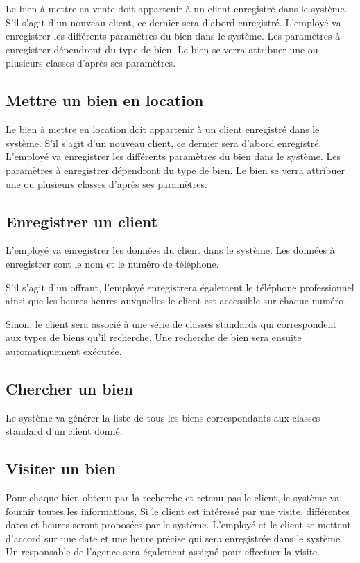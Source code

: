 Le bien à mettre en vente doit appartenir à un client enregistré dans le système. S'il s'agit d'un nouveau client, ce dernier sera d'abord enregistré. L'employé va enregistrer les différents paramètres du bien dans le système. Les paramètres à enregistrer dépendront du type de bien. Le bien se verra attribuer une ou plusieurs classes d'après ses paramètres.

\subsection{Mettre un bien en location}

Le bien à mettre en location doit appartenir à un client enregistré dans le système. S'il s'agit d'un nouveau client, ce dernier sera d'abord enregistré. L'employé va enregistrer les différents paramètres du bien dans le système. Les paramètres à enregistrer dépendront du type de bien. Le bien se verra attribuer une ou plusieurs classes d'après ses paramètres.

\subsection{Enregistrer un client}

L'employé va enregistrer les données du client dans le système. Les données à enregistrer sont le nom et le numéro de téléphone.

S'il s'agit d'un offrant, l'employé enregistrera également le téléphone professionnel ainsi que les heures heures auxquelles le client est accessible sur chaque numéro.

Sinon, le client sera associé à une série de classes standards qui correspondent aux types de biens qu'il recherche. Une recherche de bien sera ensuite automatiquement exécutée.

\subsection{Chercher un bien}

Le système va générer la liste de tous les biens correspondants aux classes standard d'un client donné.

\subsection{Visiter un bien}

Pour chaque bien obtenu par la recherche et retenu pas le client, le système va fournir toutes les informations. Si le client est intéressé par une visite, différentes dates et heures seront proposées par le système. L'employé et le client se mettent d'accord sur une date et une heure précise qui sera enregistrée dans le système. Un responsable de l'agence sera également assigné pour effectuer la visite.

